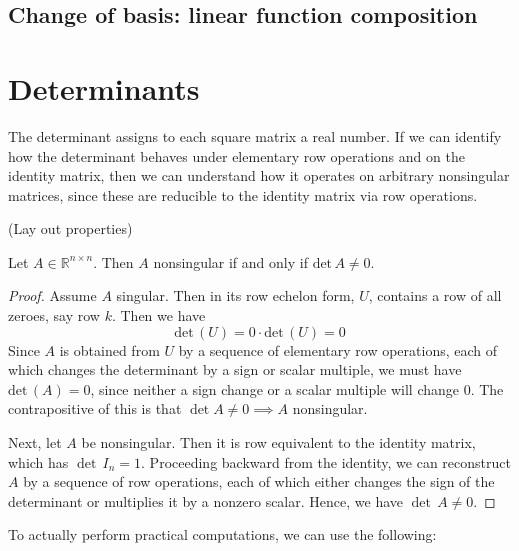 \section{Change of basis: linear function composition}








\chapter{Determinants}

The determinant assigns to each square matrix a real number. If we can identify how the determinant behaves under elementary row operations and on the identity matrix, then we can understand how it operates on arbitrary nonsingular matrices, since these are reducible to the identity matrix via row operations.

(Lay out properties)

\begin{theorem}
Let $A\in \mathbb{R}^{n \times n}$. Then $A$ nonsingular if and only if $\text{det}\, A \neq 0$.
\end{theorem}
\begin{proof}
Assume $A$ singular. Then in its row echelon form, $U$, contains a row of all zeroes, say row $k$. Then we have  \[ \text{det}\, \left( U \right) = 0\cdot \text{det} \, \left(U\right) = 0\] Since $A$ is obtained from $U$ by a sequence of elementary row operations, each of which changes the determinant by a sign or scalar multiple, we must have $\text{det}\, \left(A\right) = 0$, since neither a sign change or a scalar multiple will change $0$. The contrapositive of this is that $\det A \neq 0 \implies A$ nonsingular.

Next, let $A$ be nonsingular. Then it is row equivalent to the identity matrix, which has $\det \, I_n = 1$. Proceeding backward from the identity, we can reconstruct $A$ by a sequence of row operations, each of which either changes the sign of the determinant or multiplies it by a nonzero scalar. Hence, we have $\det \, A \neq 0$.
\end{proof}



To actually perform practical computations, we can use the following:

